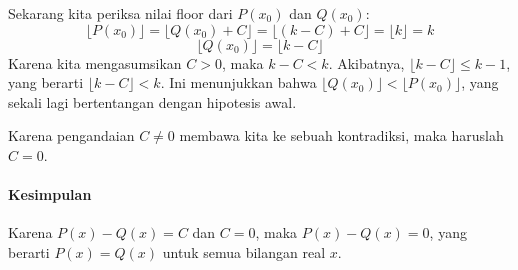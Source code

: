 \documentclass[12pt]{article}
\theoremstyle{mystyle}
\begin{document}
Sekarang kita periksa nilai floor dari $P(x_0)$ dan $Q(x_0)$:
\[ \lfloor P(x_0) \rfloor = \lfloor Q(x_0) + C \rfloor = \lfloor (k-C) + C \rfloor = \lfloor k \rfloor = k \]
\[ \lfloor Q(x_0) \rfloor = \lfloor k-C \rfloor \]
Karena kita mengasumsikan $C>0$, maka $k-C < k$. Akibatnya, $\lfloor k-C \rfloor \le k-1$, yang berarti $\lfloor k-C \rfloor < k$.
Ini menunjukkan bahwa $\lfloor Q(x_0) \rfloor < \lfloor P(x_0) \rfloor$, yang sekali lagi bertentangan dengan hipotesis awal.

Karena pengandaian $C \neq 0$ membawa kita ke sebuah kontradiksi, maka haruslah $C=0$.

\paragraph{Kesimpulan}
Karena $P(x) - Q(x) = C$ dan $C=0$, maka $P(x)-Q(x)=0$, yang berarti $P(x)=Q(x)$ untuk semua bilangan real $x$.
\end{document}

